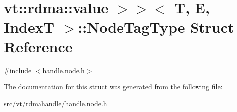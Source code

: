 \hypertarget{structvt_1_1rdma_1_1_handle_3_01_t_00_01_e_00_01_index_t_00_01typename_01std_1_1enable__if__t_3_bffc9b31b7d701a9d14f97993404e892}{}\section{vt\+:\+:rdma\+:\+:value $>$$>$$<$ T, E, IndexT $>$\+:\+:Node\+Tag\+Type Struct Reference}
\label{structvt_1_1rdma_1_1_handle_3_01_t_00_01_e_00_01_index_t_00_01typename_01std_1_1enable__if__t_3_bffc9b31b7d701a9d14f97993404e892}


{\ttfamily \#include $<$handle.\+node.\+h$>$}



The documentation for this struct was generated from the following file\+:\begin{DoxyCompactItemize}
\item 
src/vt/rdmahandle/\hyperlink{handle_8node_8h}{handle.\+node.\+h}\end{DoxyCompactItemize}
